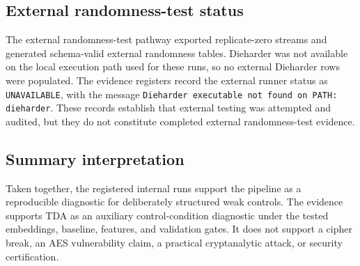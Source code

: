 \subsection{External randomness-test status}
\label{subsec:external-randomness-status-results}

The external randomness-test pathway exported replicate-zero streams and generated schema-valid external randomness tables. Dieharder was not available on the local execution path used for these runs, so no external Dieharder rows were populated. The evidence registers record the external runner status as \texttt{UNAVAILABLE}, with the message \texttt{Dieharder executable not found on PATH: dieharder}. These records establish that external testing was attempted and audited, but they do not constitute completed external randomness-test evidence.

\subsection{Summary interpretation}
\label{subsec:results-summary-interpretation}

Taken together, the registered internal runs support the pipeline as a reproducible diagnostic for deliberately structured weak controls. The evidence supports TDA as an auxiliary control-condition diagnostic under the tested embeddings, baseline, features, and validation gates. It does not support a cipher break, an AES vulnerability claim, a practical cryptanalytic attack, or security certification.
